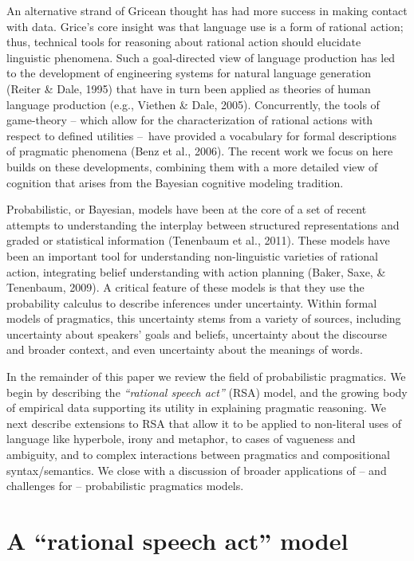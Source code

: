 \documentclass[]{elsarticle}
\begin{document}
An alternative strand of Gricean thought has had more success in making
contact with data. Grice's core insight was that language use is a form
of rational action; thus, technical tools for reasoning about rational
action should elucidate linguistic phenomena. Such a goal-directed view
of language production has led to the development of engineering systems
for natural language generation (Reiter \& Dale, 1995) that have in turn
been applied as theories of human language production (e.g., Viethen \&
Dale, 2005). Concurrently, the tools of game-theory -- which allow for
the characterization of rational actions with respect to defined
utilities --~have provided a vocabulary for formal descriptions of
pragmatic phenomena (Benz et al., 2006). The recent work we focus on
here builds on these developments, combining them with a more detailed
view of cognition that arises from the Bayesian cognitive modeling
tradition.

Probabilistic, or Bayesian, models have been at the core of a set of
recent attempts to understanding the interplay between structured
representations and graded or statistical information (Tenenbaum et al.,
2011). These models have been an important tool for understanding
non-linguistic varieties of rational action, integrating belief
understanding with action planning (Baker, Saxe, \& Tenenbaum, 2009). A
critical feature of these models is that they use the probability
calculus to describe inferences under uncertainty. Within formal models
of pragmatics, this uncertainty stems from a variety of sources,
including uncertainty about speakers' goals and beliefs, uncertainty
about the discourse and broader context, and even uncertainty about the
meanings of words.

In the remainder of this paper we review the field of probabilistic
pragmatics. We begin by describing the \emph{``rational speech act''}
(RSA) model, and the growing body of empirical data supporting its
utility in explaining pragmatic reasoning. We next describe extensions
to RSA that allow it to be applied to non-literal uses of language like
hyperbole, irony and metaphor, to cases of vagueness and ambiguity, and
to complex interactions between pragmatics and compositional
syntax/semantics. We close with a discussion of broader applications of
-- and challenges for -- probabilistic pragmatics models.

\section{A ``rational speech act'' model}\label{a-rational-speech-act-model}
\end{document}
